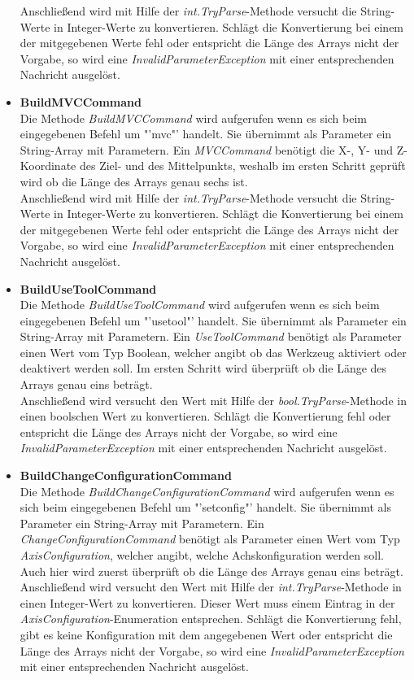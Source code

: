 \begin{itemize}
Anschließend wird mit Hilfe der \textit{int.TryParse}-Methode versucht die String-Werte in Integer-Werte zu konvertieren. Schlägt die Konvertierung bei einem der mitgegebenen Werte fehl oder entspricht die Länge des Arrays nicht der Vorgabe, so wird eine \textit{InvalidParameterException} mit einer entsprechenden Nachricht ausgelöst.
\item \textbf{BuildMVCCommand}\\
Die Methode \textit{BuildMVCCommand} wird aufgerufen wenn es sich beim eingegebenen Befehl um "'mvc"' handelt. Sie übernimmt als Parameter ein String-Array mit Parametern. Ein \textit{MVCCommand} benötigt die X-, Y- und Z-Koordinate des Ziel- und des Mittelpunkts, weshalb im ersten Schritt geprüft wird ob die Länge des Arrays genau sechs ist. \\
Anschließend wird mit Hilfe der \textit{int.TryParse}-Methode versucht die String-Werte in Integer-Werte zu konvertieren. Schlägt die Konvertierung bei einem der mitgegebenen Werte fehl oder entspricht die Länge des Arrays nicht der Vorgabe, so wird eine \textit{InvalidParameterException} mit einer entsprechenden Nachricht ausgelöst.
\item \textbf{BuildUseToolCommand}\\
Die Methode \textit{BuildUseToolCommand} wird aufgerufen wenn es sich beim eingegebenen Befehl um "'usetool"' handelt. Sie übernimmt als Parameter ein String-Array mit Parametern. Ein \textit{UseToolCommand} benötigt als Parameter einen Wert vom Typ Boolean, welcher angibt ob das Werkzeug aktiviert oder deaktivert werden soll. Im ersten Schritt wird überprüft ob die Länge des Arrays genau eins beträgt.\\
Anschließend wird versucht den Wert mit Hilfe der \textit{bool.TryParse}-Methode in einen boolschen Wert zu konvertieren. Schlägt die Konvertierung fehl oder entspricht die Länge des Arrays nicht der Vorgabe, so wird eine \textit{InvalidParameterException} mit einer entsprechenden Nachricht ausgelöst.
\item \textbf{BuildChangeConfigurationCommand}\\
Die Methode \textit{BuildChangeConfigurationCommand} wird aufgerufen wenn es sich beim eingegebenen Befehl um "'setconfig"' handelt. Sie übernimmt als Parameter ein String-Array mit Parametern. Ein \textit{ChangeConfigurationCommand} benötigt als Parameter einen Wert vom Typ \textit{AxisConfiguration}, welcher angibt, welche Achskonfiguration werden soll. Auch hier wird zuerst überprüft ob die Länge des Arrays genau eins beträgt.\\
Anschließend wird versucht den Wert mit Hilfe der \textit{int.TryParse}-Methode in einen Integer-Wert zu konvertieren. Dieser Wert muss einem Eintrag in der \textit{AxisConfiguration}-Enumeration entsprechen. Schlägt die Konvertierung fehl, gibt es keine Konfiguration mit dem angegebenen Wert oder entspricht die Länge des Arrays nicht der Vorgabe, so wird eine \textit{InvalidParameterException} mit einer entsprechenden Nachricht ausgelöst.
\end{itemize}

